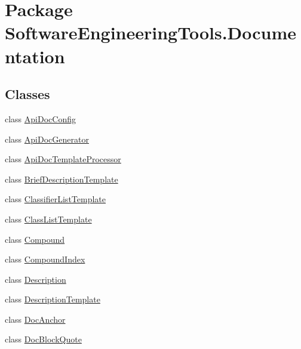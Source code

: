 \hypertarget{namespace_software_engineering_tools_1_1_documentation}{\section{Package Software\+Engineering\+Tools.\+Documentation}
\label{namespace_software_engineering_tools_1_1_documentation}
}
\subsection*{Classes}
\begin{DoxyCompactItemize}
\item 
class \hyperlink{class_software_engineering_tools_1_1_documentation_1_1_api_doc_config}{Api\+Doc\+Config}
\item 
class \hyperlink{class_software_engineering_tools_1_1_documentation_1_1_api_doc_generator}{Api\+Doc\+Generator}
\item 
class \hyperlink{class_software_engineering_tools_1_1_documentation_1_1_api_doc_template_processor}{Api\+Doc\+Template\+Processor}
\item 
class \hyperlink{class_software_engineering_tools_1_1_documentation_1_1_brief_description_template}{Brief\+Description\+Template}
\item 
class \hyperlink{class_software_engineering_tools_1_1_documentation_1_1_classifier_list_template}{Classifier\+List\+Template}
\item 
class \hyperlink{class_software_engineering_tools_1_1_documentation_1_1_class_list_template}{Class\+List\+Template}
\item 
class \hyperlink{class_software_engineering_tools_1_1_documentation_1_1_compound}{Compound}
\item 
class \hyperlink{class_software_engineering_tools_1_1_documentation_1_1_compound_index}{Compound\+Index}
\item 
class \hyperlink{class_software_engineering_tools_1_1_documentation_1_1_description}{Description}
\item 
class \hyperlink{class_software_engineering_tools_1_1_documentation_1_1_description_template}{Description\+Template}
\item 
class \hyperlink{class_software_engineering_tools_1_1_documentation_1_1_doc_anchor}{Doc\+Anchor}
\item 
class \hyperlink{class_software_engineering_tools_1_1_documentation_1_1_doc_block_quote}{Doc\+Block\+Quote}

\end{DoxyCompactItemize}
